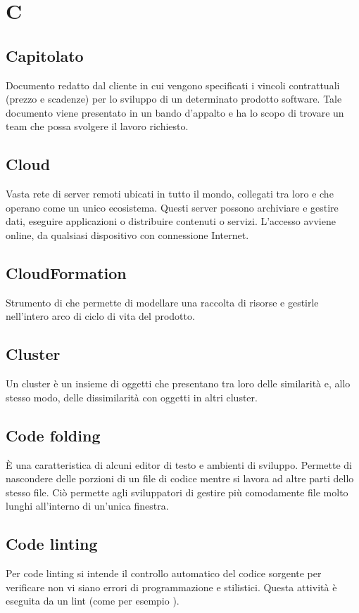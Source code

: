 \section*{C}
\markright{}

\subsection*{Capitolato}
Documento redatto dal cliente in cui vengono specificati i vincoli contrattuali (prezzo e scadenze) per lo sviluppo di un determinato prodotto software. Tale documento viene presentato in un bando d'appalto e ha lo scopo di trovare un team che possa svolgere il lavoro richiesto.

\subsection*{Cloud}
Vasta rete di server remoti ubicati in tutto il mondo, collegati tra loro e che operano come un unico ecosistema. Questi server possono archiviare e gestire dati, eseguire applicazioni o distribuire contenuti o servizi. L'accesso avviene online, da qualsiasi dispositivo con connessione Internet.

\subsection*{CloudFormation}
Strumento di  che permette di modellare una raccolta di risorse  e gestirle nell'intero arco di ciclo di vita del prodotto.

\subsection*{Cluster}
Un cluster è un insieme di oggetti che presentano tra loro delle similarità e, allo stesso modo, delle dissimilarità con oggetti in altri cluster.

\subsection*{Code folding}
È una caratteristica di alcuni editor di testo e ambienti di sviluppo. Permette di nascondere delle porzioni di un file di codice mentre si lavora ad altre parti dello stesso file. Ciò permette agli sviluppatori di gestire più comodamente file molto lunghi all'interno di un'unica finestra.

\subsection*{Code linting}
Per code linting si intende il controllo automatico del codice sorgente per verificare non vi siano errori di programmazione e stilistici. Questa attività è eseguita da un lint (come per esempio ).

